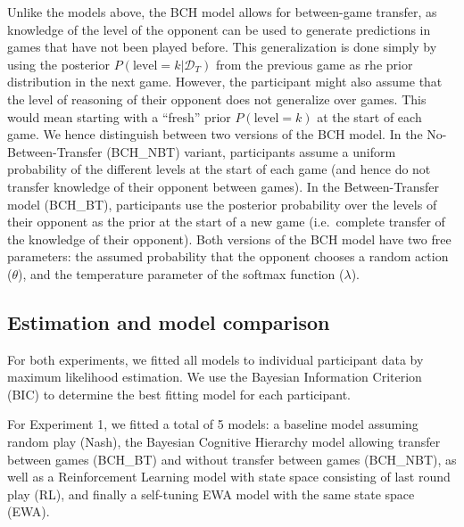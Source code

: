 \documentclass[
  english,
  man,floatsintext]{apa6}
\begin{document}
Unlike the models above, the BCH model allows for between-game transfer, as knowledge of the level of the opponent can be used to generate predictions in games that have not been played before. This generalization is done simply by using the posterior \(P(\text{level} = k|\mathcal{D}_T)\) from the previous game as rhe prior distribution in the next game. However, the participant might also assume that the level of reasoning of their opponent does not generalize over games. This would mean starting with a ``fresh'' prior \(P(\text{level} = k)\) at the start of each game. We hence distinguish between two versions of the BCH model. In the No-Between-Transfer (BCH\_NBT) variant, participants assume a uniform probability of the different levels at the start of each game (and hence do not transfer knowledge of their opponent between games). In the Between-Transfer model (BCH\_BT), participants use the posterior probability over the levels of their opponent as the prior at the start of a new game (i.e.~complete transfer of the knowledge of their opponent). Both versions of the BCH model have two free parameters: the assumed probability that the opponent chooses a random action (\(\theta\)), and the temperature parameter of the softmax function (\(\lambda\)).

\hypertarget{estimation-and-model-comparison}{%
\subsection{Estimation and model comparison}\label{estimation-and-model-comparison}}

For both experiments, we fitted all models to individual participant data by maximum likelihood estimation. We use the Bayesian Information Criterion (BIC) to determine the best fitting model for each participant.

For Experiment 1, we fitted a total of 5 models: a baseline model assuming random play (Nash), the Bayesian Cognitive Hierarchy model allowing transfer between games (BCH\_BT) and without transfer between games (BCH\_NBT), as well as a Reinforcement Learning model with state space consisting of last round play (RL), and finally a self-tuning EWA model with the same state space (EWA).
\end{document}
